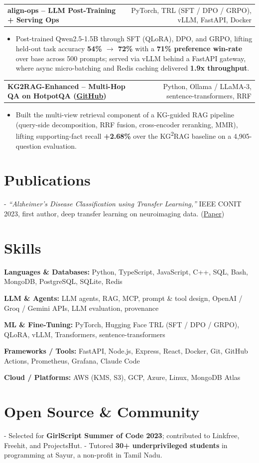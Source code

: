 \documentclass[letterpaper,11pt]{article}
\makeatletter
\newcommand{\projItem}[2]{%
  \vspace{2pt}
  \begin{tabular*}{\textwidth}{@{}l@{\extracolsep{\fill}}r@{}}
    \textbf{#1} & #2 \\
  \end{tabular*}\par\vspace{-3pt}
}
\newcommand{\skillLine}[2]{\textbf{#1:} #2\par\vspace{1.5pt}}
\newcommand{\inlineBlock}[1]{{\setlength{\leftskip}{0.18in}\small #1\par}}
\makeatother
\begin{document}
\projItem{align-ops -- LLM Post-Training + Serving Ops}{PyTorch, TRL (SFT / DPO / GRPO), vLLM, FastAPI, Docker}
\begin{itemize}
  \item Post-trained Qwen2.5-1.5B through SFT (QLoRA), DPO, and GRPO, lifting held-out task accuracy \textbf{54\% $\to$ 72\%} with a \textbf{71\% preference win-rate} over base across 500 prompts; served via vLLM behind a FastAPI gateway, where async micro-batching and Redis caching delivered \textbf{1.9x throughput}.
\end{itemize}

\projItem{KG2RAG-Enhanced -- Multi-Hop QA on HotpotQA {\normalfont\small(\href{https://github.com/Deva-1903/KG2RAG-685-NLP}{GitHub})}}{Python, Ollama / LLaMA-3, sentence-transformers, RRF}
\begin{itemize}
  \item Built the multi-view retrieval component of a KG-guided RAG pipeline (query-side decomposition, RRF fusion, cross-encoder reranking, MMR), lifting supporting-fact recall \textbf{+2.68\%} over the KG\textsuperscript{2}RAG baseline on a 4{,}905-question evaluation.
\end{itemize}

\section{Publications}
\vspace{2pt}
\inlineBlock{- \textit{``Alzheimer's Disease Classification using Transfer Learning,''} IEEE CONIT 2023, first author, deep transfer learning on neuroimaging data. {\normalfont\small(\href{https://ieeexplore.ieee.org/document/10205760}{Paper})}}

\section{Skills}
\skillLine{Languages \& Databases}{Python, TypeScript, JavaScript, C++, SQL, Bash, MongoDB, PostgreSQL, SQLite, Redis}
\skillLine{LLM \& Agents}{LLM agents, RAG, MCP, prompt \& tool design, OpenAI / Groq / Gemini APIs, LLM evaluation, provenance}
\skillLine{ML \& Fine-Tuning}{PyTorch, Hugging Face TRL (SFT / DPO / GRPO), QLoRA, vLLM, Transformers, sentence-transformers}
\skillLine{Frameworks / Tools}{FastAPI, Node.js, Express, React, Docker, Git, GitHub Actions, Prometheus, Grafana, Claude Code}
\skillLine{Cloud / Platforms}{AWS (KMS, S3), GCP, Azure, Linux, MongoDB Atlas}

\section{Open Source \& Community}
\inlineBlock{- Selected for \textbf{GirlScript Summer of Code 2023}; contributed to Linkfree, Freehit, and ProjectsHut. - Tutored \textbf{30+ underprivileged students} in programming at Sayur, a non-profit in Tamil Nadu.}
\end{document}
